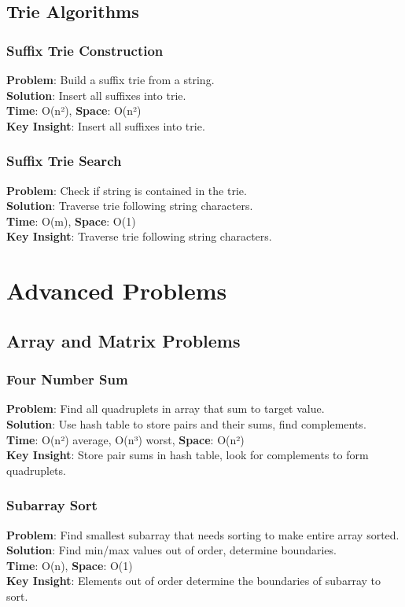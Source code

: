 \documentclass{report}
\begin{document}
\section{Trie Algorithms}

\subsection{Suffix Trie Construction}
\textbf{Problem}: Build a suffix trie from a string.\\
\textbf{Solution}: Insert all suffixes into trie.\\
\textbf{Time}: O(n²), \textbf{Space}: O(n²)\\
\textbf{Key Insight}: Insert all suffixes into trie.

\subsection{Suffix Trie Search}
\textbf{Problem}: Check if string is contained in the trie.\\
\textbf{Solution}: Traverse trie following string characters.\\
\textbf{Time}: O(m), \textbf{Space}: O(1)\\
\textbf{Key Insight}: Traverse trie following string characters.

\chapter{Advanced Problems}

\section{Array and Matrix Problems}

\subsection{Four Number Sum}
\textbf{Problem}: Find all quadruplets in array that sum to target value.\\
\textbf{Solution}: Use hash table to store pairs and their sums, find complements.\\
\textbf{Time}: O(n²) average, O(n³) worst, \textbf{Space}: O(n²)\\
\textbf{Key Insight}: Store pair sums in hash table, look for complements to form quadruplets.

\subsection{Subarray Sort}
\textbf{Problem}: Find smallest subarray that needs sorting to make entire array sorted.\\
\textbf{Solution}: Find min/max values out of order, determine boundaries.\\
\textbf{Time}: O(n), \textbf{Space}: O(1)\\
\textbf{Key Insight}: Elements out of order determine the boundaries of subarray to sort.
\end{document}
